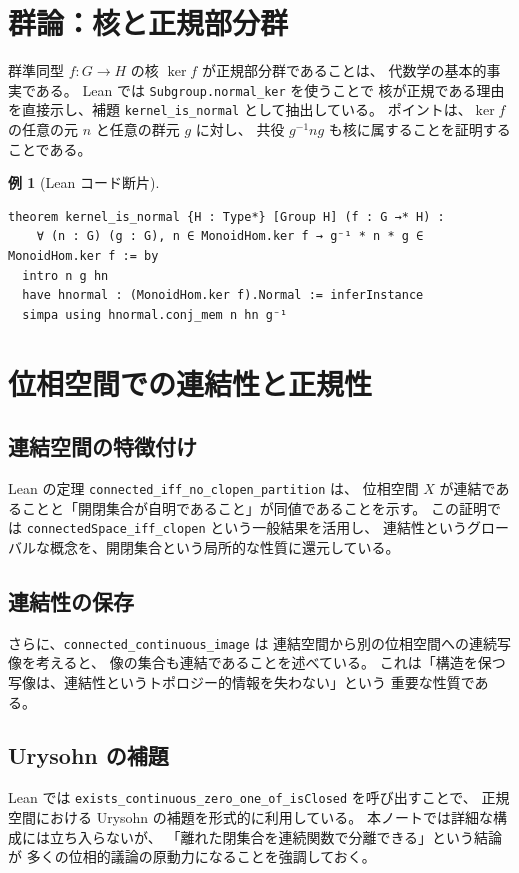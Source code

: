 \documentclass[a4paper]{ltjsarticle}
\theoremstyle{definition}
\newtheorem{example}{例}[section]
\theoremstyle{plain}
\theoremstyle{remark}
\begin{document}
\section{群論：核と正規部分群}
群準同型 $f\colon G \to H$ の核 $\ker f$ が正規部分群であることは、
代数学の基本的事実である。
Lean では \texttt{Subgroup.normal\_ker} を使うことで
核が正規である理由を直接示し、補題 \texttt{kernel\_is\_normal} として抽出している。
ポイントは、$\ker f$ の任意の元 $n$ と任意の群元 $g$ に対し、
共役 $g^{-1}ng$ も核に属することを証明することである。

\begin{example}[Lean コード断片]
\begin{lstlisting}
theorem kernel_is_normal {H : Type*} [Group H] (f : G →* H) :
    ∀ (n : G) (g : G), n ∈ MonoidHom.ker f → g⁻¹ * n * g ∈ MonoidHom.ker f := by
  intro n g hn
  have hnormal : (MonoidHom.ker f).Normal := inferInstance
  simpa using hnormal.conj_mem n hn g⁻¹
\end{lstlisting}
\end{example}

\section{位相空間での連結性と正規性}
\subsection{連結空間の特徴付け}
Lean の定理 \texttt{connected\_iff\_no\_clopen\_partition} は、
位相空間 $X$ が連結であることと「開閉集合が自明であること」が同値であることを示す。
この証明では \texttt{connectedSpace\_iff\_clopen} という一般結果を活用し、
連結性というグローバルな概念を、開閉集合という局所的な性質に還元している。

\subsection{連結性の保存}
さらに、\texttt{connected\_continuous\_image} は
連結空間から別の位相空間への連続写像を考えると、
像の集合も連結であることを述べている。
これは「構造を保つ写像は、連結性というトポロジー的情報を失わない」という
重要な性質である。

\subsection{Urysohn の補題}
Lean では \texttt{exists\_continuous\_zero\_one\_of\_isClosed} を呼び出すことで、
正規空間における Urysohn の補題を形式的に利用している。
本ノートでは詳細な構成には立ち入らないが、
「離れた閉集合を連続関数で分離できる」という結論が
多くの位相的議論の原動力になることを強調しておく。
\end{document}
